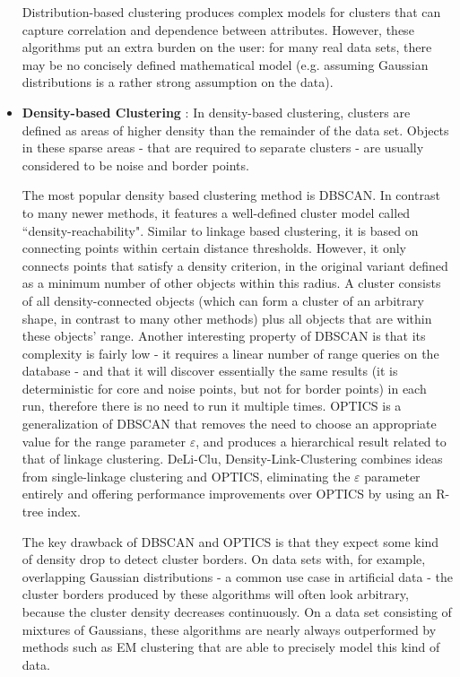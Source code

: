 \begin{itemize}
Distribution-based clustering produces complex models for clusters that can capture correlation and dependence
between attributes. However, these algorithms put an extra burden on the user: for many real data sets, there may
be no concisely defined mathematical model (e.g. assuming Gaussian distributions is a rather strong assumption
on the data).

\item \textbf{Density-based Clustering} : In density-based clustering, clusters are defined as areas of higher density
than the remainder of the data set. Objects in these sparse areas - that are required to separate clusters - are usually
considered to be noise and border points.

The most popular density based clustering method is DBSCAN. In contrast to many newer methods, it features a well-defined
cluster model called ``density-reachability". Similar to linkage based clustering, it is based on connecting points within
certain distance thresholds. However, it only connects points that satisfy a density criterion, in the original variant
defined as a minimum number of other objects within this radius. A cluster consists of all density-connected objects
(which can form a cluster of an arbitrary shape, in contrast to many other methods) plus all objects that are within
these objects' range. Another interesting property of DBSCAN is that its complexity is fairly low - it requires a linear
number of range queries on the database - and that it will discover essentially the same results (it is deterministic
for core and noise points, but not for border points) in each run, therefore there is no need to run it multiple times.
OPTICS is a generalization of DBSCAN that removes the need to choose an appropriate value for the range parameter ${\varepsilon}$,
and produces a hierarchical result related to that of linkage clustering. DeLi-Clu, Density-Link-Clustering combines ideas
from single-linkage clustering and OPTICS, eliminating the ${\varepsilon}$ parameter entirely and offering performance improvements
over OPTICS by using an R-tree index.

The key drawback of DBSCAN and OPTICS is that they expect some kind of density drop to detect cluster borders.
On data sets with, for example, overlapping Gaussian distributions - a common use case in artificial data - the
cluster borders produced by these algorithms will often look arbitrary, because the cluster density decreases
continuously. On a data set consisting of mixtures of Gaussians, these algorithms are nearly always outperformed
by methods such as EM clustering that are able to precisely model this kind of data.


\end{itemize}
